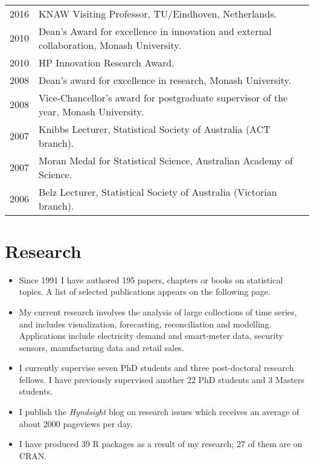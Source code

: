 \documentclass[a4paper,10pt]{article}
\begin{document}
~\begin{tabular}{ll}
2016 & KNAW Visiting Professor, TU/Eindhoven, Netherlands.\\
2010 & Dean's Award for excellence in innovation and external collaboration, Monash University.\\
2010 & HP Innovation Research Award.\\
2008 & Dean's award for excellence in research, Monash University.\\
2008 & Vice-Chancellor's award for postgraduate supervisor of the year, Monash University.\\
2007 & Knibbs Lecturer, Statistical Society of Australia (ACT branch).\\
2007 & Moran Medal for Statistical Science, Australian Academy of Science.\\
2006 & Belz Lecturer, Statistical Society of Australia (Victorian branch).
\end{tabular}

\section{Research}

\begin{itemize}\parskip=0cm
\item Since 1991 I have authored 195 papers, chapters or books on statistical topics. A list of selected publications appears on the following page.
\item  My current research involves the analysis of large collections of time series, and includes visualization, forecasting, reconciliation and modelling. Applications include electricity demand and smart-meter data, security sensors, manufacturing data and retail sales.
\item I currently supervise seven PhD students and three post-doctoral research fellows. I have previously supervised another 22 PhD students and 3 Masters students.
\item I publish the \emph{Hyndsight} blog on research issues which receives an average of about 2000 pageviews per day.
\item I have produced 39 R packages as a result of my research; 27 of them are on CRAN.
\end{itemize}
\end{document}
